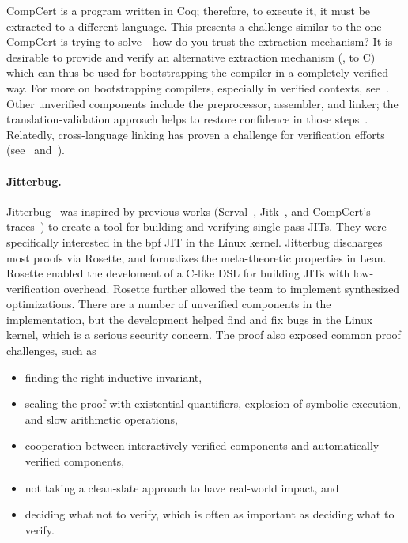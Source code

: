 CompCert is a program written in Coq; therefore, to execute it, it must be
extracted to a different language. This presents a challenge similar to the one
CompCert is trying to solve---how do you trust the extraction mechanism? It is
desirable to provide and verify an alternative extraction mechanism (\eg, to C)
which can thus be used for bootstrapping the compiler in a completely verified
way. For more on bootstrapping compilers, especially in verified contexts,
see~\cite{Konat_2016,Myreen_2021}. Other unverified components include the
preprocessor, assembler, and linker; the translation-validation approach helps
to restore confidence in those steps~\cite[Section~5]{Kastner-LBSSF-2017}.
Relatedly, cross-language linking has proven a challenge for verification
efforts (see~\cite[Section~4]{Kastner-LBSSF-2017} and~\cite{Wang_2014}).

\paragraph{Jitterbug.} Jitterbug~\cite{258848} was inspired by previous works
(Serval~\cite{Nelson_2019}, Jitk~\cite{186144}, and CompCert's
traces~\cite{Kastner-LBSSF-2017}) to create a tool for building and verifying
single-pass JITs. They were specifically interested in the \gls{bpf} JIT in the
Linux kernel. Jitterbug discharges most proofs via Rosette, and formalizes the
meta-theoretic properties in Lean. Rosette enabled the develoment of a C-like
DSL for building JITs with low-verification overhead. Rosette further allowed
the team to implement synthesized optimizations. There are a number of
unverified components in the implementation, but the development helped find and
fix bugs in the Linux kernel, which is a serious security concern. The proof
also exposed common proof challenges, such as
\begin{itemize}
    \item finding the right inductive invariant,
    \item scaling the proof with existential quantifiers, explosion of symbolic
        execution, and slow arithmetic operations,
    \item cooperation between interactively verified components and automatically
        verified components,
    \item not taking a clean-slate approach to have real-world impact, and
    \item deciding what not to verify, which is often as important as deciding
        what to verify.
\end{itemize}

